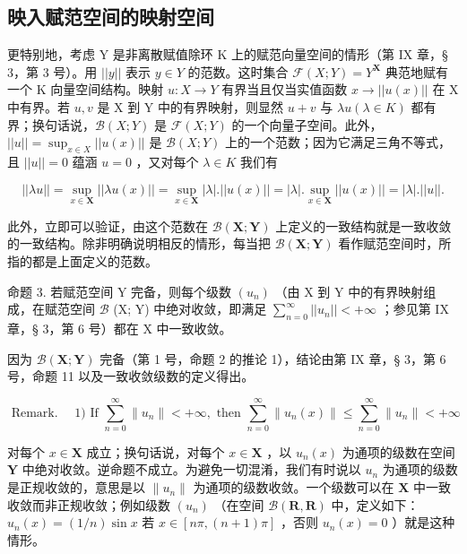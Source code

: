 \subsection{映入赋范空间的映射空间}

更特别地，考虑 Y 是非离散赋值除环 K 上的赋范向量空间的情形（第 IX 章，§ 3，第 3 号）。用 \(||y||\) 表示 \(y \in Y\) 的范数。这时集合 \(\mathcal{F}(X;Y) = Y^{\mathbf{X}}\) 典范地赋有一个 K 向量空间结构。映射 \(u: X \to Y\) 有界当且仅当实值函数 \(x \to ||u(x)||\) 在 X 中有界。若 \(u, v\) 是 X 到 Y 中的有界映射，则显然 \(u + v\) 与 \(\lambda u (\lambda \in K)\) 都有界；换句话说，\(\mathcal{B}(X;Y)\) 是 \(\mathcal{F}(X;Y)\) 的一个向量子空间。此外，\(||u|| = \sup_{x \in X} ||u(x)||\) 是 \(\mathcal{B}(X;Y)\) 上的一个范数；因为它满足三角不等式，且 \(||u|| = 0\) 蕴涵 \(u = 0\) ，又对每个 \(\lambda \in K\) 我们有

\[
| | \lambda u | | = \sup _ {x \in \mathbf {X}} | | \lambda u (x) | | = \sup _ {x \in \mathbf {X}} | \lambda |. | | u (x) | | = | \lambda |. \sup _ {x \in \mathbf {X}} | | u (x) | | = | \lambda |. | | u | |.
\]

此外，立即可以验证，由这个范数在 \(\mathcal{B}(\mathbf{X};\mathbf{Y})\) 上定义的一致结构就是一致收敛的一致结构。除非明确说明相反的情形，每当把 \(\mathcal{B}(\mathbf{X};\mathbf{Y})\) 看作赋范空间时，所指的都是上面定义的范数。

命题 3. 若赋范空间 Y 完备，则每个级数 \((u_n)\) （由 X 到 Y 中的有界映射组成，在赋范空间 \(\mathcal{B}\) (X; Y) 中绝对收敛，即满足 \(\sum_{n=0}^{\infty}||u_n|| < +\infty\) ；参见第 IX 章，§ 3，第 6 号）都在 X 中一致收敛。

因为 \(\mathcal{B}(\mathbf{X};\mathbf{Y})\) 完备（第 1 号，命题 2 的推论 1），结论由第 IX 章，§ 3，第 6 号，命题 11 以及一致收敛级数的定义得出。

\[
\text { Remark. } \quad 1) \text {   If   } \sum_ {n = 0} ^ {\infty} \| u _ {n} \| <   + \infty , \text {   then   } \sum_ {n = 0} ^ {\infty} \| u _ {n} (x) \| \leqslant \sum_ {n = 0} ^ {\infty} \| u _ {n} \| <   + \infty
\]

对每个 \(x \in \mathbf{X}\) 成立；换句话说，对每个 \(x \in \mathbf{X}\) ，以 \(u_n(x)\) 为通项的级数在空间 \(\mathbf{Y}\) 中绝对收敛。逆命题不成立。为避免一切混淆，我们有时说以 \(u_n\) 为通项的级数是正规收敛的，意思是以 \(\| u_n \|\) 为通项的级数收敛。一个级数可以在 \(\mathbf{X}\) 中一致收敛而非正规收敛；例如级数 \((u_n)\) （在空间 \(\mathcal{B}(\mathbf{R}, \mathbf{R})\) 中，定义如下：\(u_n(x) = (1/n) \sin x\) 若 \(x \in [n\pi, (n + 1)\pi]\) ，否则 \(u_n(x) = 0\) ）就是这种情形。

